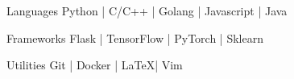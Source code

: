 


\begin{cvskills}


  \cvskill
  {Languages}
  {Python | C/C++ | Golang | Javascript | Java}


  \cvskill
  {Frameworks}
  {Flask | TensorFlow | PyTorch | Sklearn}


  \cvskill
  {Utilities}
	{ Git | Docker | \LaTeX | Vim}




\end{cvskills}
